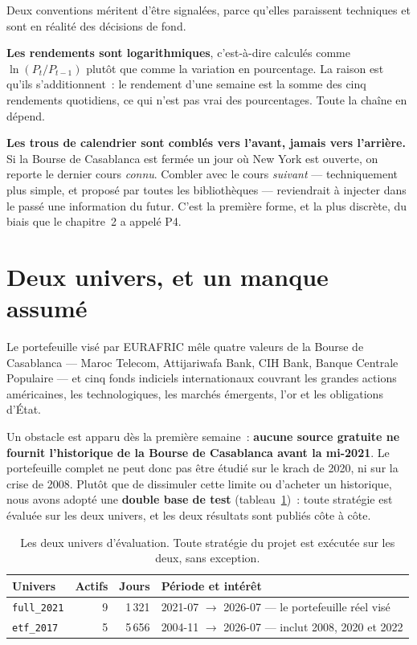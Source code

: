 Deux conventions méritent d'être signalées, parce qu'elles paraissent techniques
et sont en réalité des décisions de fond.

\textbf{Les rendements sont logarithmiques}, c'est-à-dire calculés comme
$\ln(P_t/P_{t-1})$ plutôt que comme la variation en pourcentage. La raison est
qu'ils s'additionnent~: le rendement d'une semaine est la somme des cinq
rendements quotidiens, ce qui n'est pas vrai des pourcentages. Toute la chaîne en
dépend.

\textbf{Les trous de calendrier sont comblés vers l'avant, jamais vers
l'arrière.} Si la Bourse de Casablanca est fermée un jour où New York est
ouverte, on reporte le dernier cours \emph{connu}. Combler avec le cours
\emph{suivant} — techniquement plus simple, et proposé par toutes les
bibliothèques — reviendrait à injecter dans le passé une information du futur.
C'est la première forme, et la plus discrète, du biais que le chapitre~2 a
appelé P4.

\section{Deux univers, et un manque assumé}

Le portefeuille visé par EURAFRIC mêle quatre valeurs de la Bourse de Casablanca
— Maroc Telecom, Attijariwafa Bank, CIH Bank, Banque Centrale Populaire — et cinq
fonds indiciels internationaux couvrant les grandes actions américaines, les
technologiques, les marchés émergents, l'or et les obligations d'État.

Un obstacle est apparu dès la première semaine~: \textbf{aucune source gratuite ne
fournit l'historique de la Bourse de Casablanca avant la mi-2021}. Le portefeuille
complet ne peut donc pas être étudié sur le krach de 2020, ni sur la crise de
2008. Plutôt que de dissimuler cette limite ou d'acheter un historique, nous
avons adopté une \textbf{double base de test} (tableau~\ref{tab:univers})~: toute
stratégie est évaluée sur les deux univers, et les deux résultats sont publiés
côte à côte.

\begin{table}[htbp]
  \centering
  \small
  \caption[Les deux univers de test]{Les deux univers d'évaluation. Toute
  stratégie du projet est exécutée sur les deux, sans exception.}
  \label{tab:univers}
  \begin{tabular}{@{}lrrl@{}}
    \toprule
    \textbf{Univers} & \textbf{Actifs} & \textbf{Jours} & \textbf{Période et intérêt} \\
    \midrule
    \texttt{full\_2021} & 9 & 1\,321 &
    2021-07 $\rightarrow$ 2026-07 — le portefeuille réel visé \\
    \texttt{etf\_2017} & 5 & 5\,656 &
    2004-11 $\rightarrow$ 2026-07 — inclut 2008, 2020 et 2022 \\
    \bottomrule
  \end{tabular}
\end{table}

